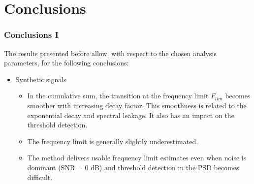 \documentclass[11pt,aspectratio=169]{beamer}
\begin{document}
	\section{Conclusions}
	\begin{frame}
		\frametitle{Conclusions I}
		The results presented before allow, with respect to the chosen analysis parameters, for the following conclusions:
		\begin{itemize}
			\item \parbox{50mm}{\textcolor{RIPtitlecol}{Synthetic signals}}
			\begin{itemize}
				\item In the cumulative sum, the transition at the frequency limit $F_{lim}$ becomes smoother with increasing decay factor. This smoothness is related to the exponential decay and spectral leakage. It also has an impact on the threshold detection.
				\item The frequency limit is generally slightly underestimated.
				\item The method delivers usable frequency limit estimates even when noise is dominant (SNR = 0 dB) and threshold detection in the PSD becomes difficult.
			\end{itemize}
		\end{itemize}
	\end{frame}
\end{document}

